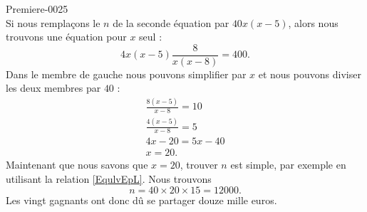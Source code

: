 \begin{corrige}{Premiere-0025}
\begin{equation}
    \end{equation}
    Si nous remplaçons le \( n\) de la seconde équation par \( 40x(x-5)\), alors nous trouvons une équation pour \( x \) seul :
    \begin{equation}
        4x(x-5)\frac{ 8 }{ x(x-8) }=400.
    \end{equation}
    Dans le membre de gauche nous pouvons simplifier par \( x\) et nous pouvons diviser les deux membres par \( 40\) :
    \begin{subequations}
        \begin{align}
            \frac{ 8(x-5) }{ x-8 }=10\\
            \frac{ 4(x-5) }{ x-8 }=5\\
            4x-20=5x-40\\
            x=20.
        \end{align}
    \end{subequations}
    Maintenant que nous savons que \( x=20\), trouver \( n\) est simple, par exemple en utilisant la relation \eqref{EqulvEpL}. Nous trouvons
    \begin{equation}
        n=40\times 20\times 15=12000.
    \end{equation}
    Les vingt gagnants ont donc dû se partager douze mille euros.

\end{corrige}
